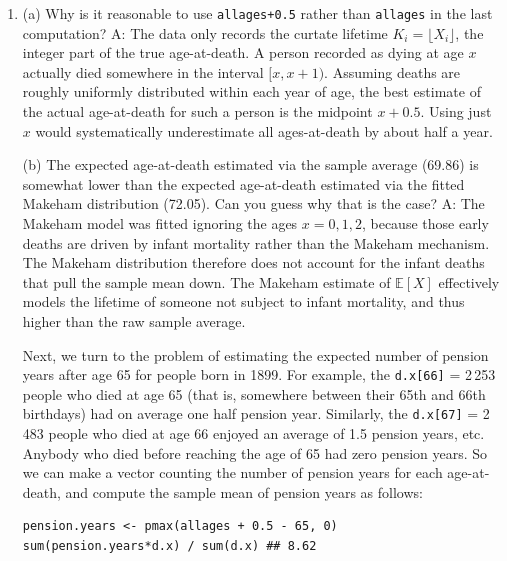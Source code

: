 \documentclass{article}
\begin{document}
\begin{enumerate}
\begin{verbatim}
sum((allages+0.5)*d.x) / sum(d.x) ## 69.86
\end{verbatim}
\newpage
\item[$\boldsymbol{Q_4}$] (a) Why is it reasonable to use \texttt{allages+0.5} rather than \texttt{allages} in the last computation?
\newline \newline A:
The data only records the curtate lifetime $K_i = \lfloor X_i \rfloor$, the integer part of the true age-at-death. A person recorded as dying at age $x$ actually died somewhere in the interval $[x,x+1)$. 
Assuming deaths are roughly uniformly distributed within each year of age, the best estimate of the actual age-at-death for such a person is the midpoint $x+0.5$. 
Using just $x$ would systematically underestimate all ages-at-death by about half a year.

(b) The expected age-at-death estimated via the sample average (69.86) is somewhat lower than the expected age-at-death estimated via the fitted Makeham distribution (72.05). Can you guess why that is the case?
\newline \newline A: 
The Makeham model was fitted ignoring the ages $x=0,1,2$, because those early deaths are driven by infant mortality rather than the Makeham mechanism. 
The Makeham distribution therefore does not account for the infant deaths that pull the sample mean down. The Makeham estimate of $\mathbb{E}[X]$ effectively models the lifetime of someone not subject to infant mortality, and thus higher than the raw sample average.

\newpage
Next, we turn to the problem of estimating the expected number of pension years after age 65 for people born in 1899. For example, the \texttt{d.x[66]} = 2\,253 people who died at age 65 (that is, somewhere between their 65th and 66th birthdays) had on average one half pension year. Similarly, the \texttt{d.x[67]} = 2\,483 people who died at age 66 enjoyed an average of 1.5 pension years, etc. Anybody who died before reaching the age of 65 had zero pension years. So we can make a vector counting the number of pension years for each age-at-death, and compute the sample mean of pension years as follows:

\begin{verbatim}
pension.years <- pmax(allages + 0.5 - 65, 0)
sum(pension.years*d.x) / sum(d.x) ## 8.62
\end{verbatim}


\end{enumerate}
\end{document}
